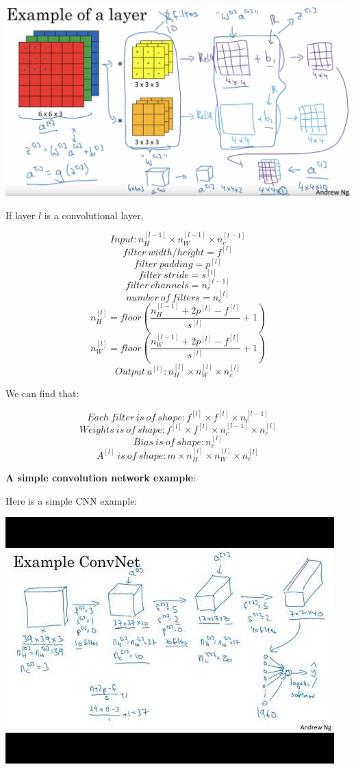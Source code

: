 \documentclass{article}
\begin{document}
\begin{center}
\includegraphics[scale=0.2]{./images/one_layer_of_a_convolutional_net.png}
\end{center}

\noindent If layer \(l\) is a convolutional layer,

\[Input: n_{H}^{[l - 1]} \times n_{W}^{[l - 1]} \times n_{c}^{[l - 1]}\]
\[filter \ width/height = f^{[l]}\]
\[filter \ padding = p^{[l]}\]
\[filter \ stride = s^{[l]}\]
\[filter \ channels = n_{c}^{[l - 1]}\]
\[number \ of \ filters = n_{c}^{[l]}\]
\[n_{H}^{[l]} = floor(\frac{n_{H}^{[l - 1]} + 2p^{[l]} - f^{[l]}}{s^{[l]}} + 1)\]
\[n_{W}^{[l]} = floor(\frac{n_{W}^{[l - 1]} + 2p^{[l]} - f^{[l]}}{s^{[l]}} + 1)\]
\[Output \ a^{[l]}: n_{H}^{[l]} \times n_{W}^{[l]} \times n_{c}^{[l]}\]

\noindent We can find that:

\[Each \ filter \ is \ of \ shape: f^{[l]} \times f^{[l]} \times n_{c}^{[l - 1]}\]
\[Weights \ is \ of \ shape: f^{[l]} \times f^{[l]} \times n_{c}^{[l - 1]} \times n_{c}^{[l]}\]
\[Bias \ is \ of \ shape: n_{c}^{[l]}\]
\[A^{[l]} \ is \ of \ shape: m \times n_{H}^{[l]} \times n_{W}^{[l]} \times n_{c}^{[l]}\]

\noindent \textbf{A simple convolution network example}:

\noindent Here is a simple CNN example:

\begin{center}
\includegraphics[scale=0.6]{./images/simple_cnn_example.jpg}
\end{center}
\end{document}
